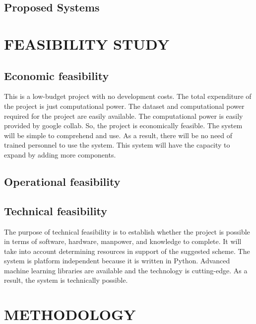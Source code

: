 \documentclass[12 pt]{article}
\begin{document}
\subsection{Proposed Systems}
\newpage


\section{FEASIBILITY STUDY}
\subsection{Economic feasibility}
This is a low-budget project with no development costs. The total expenditure of the
project is just computational power. The dataset and computational power required for
the project are easily available. The computational power is easily provided by google
collab. So, the project is economically feasible. The system will be simple to
comprehend and use. As a result, there will be no need of trained personnel to use the
system. This system will have the capacity to expand by adding more components.
\subsection{Operational feasibility}
\subsection{Technical feasibility}
The purpose of technical feasibility is to establish whether the project is possible in
terms of software, hardware, manpower, and knowledge to complete. It will take into
account determining resources in support of the suggested scheme. The system is
platform independent because it is written in Python. Advanced machine learning
libraries are available and the technology is cutting-edge. As a result, the system is
technically possible.
\newpage

\section{METHODOLOGY}
\end{document}
